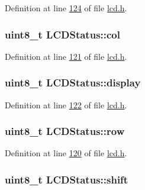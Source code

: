 Definition at line \hyperlink{lcd_8h_source_l00124}{124} of file \hyperlink{lcd_8h_source}{lcd.\-h}.

\hypertarget{struct_l_c_d_status_a79a5d5cb370566c8638d9a3866ff8e6b}{
\subsubsection[{col}]{\setlength{\rightskip}{0pt plus 5cm}uint8\-\_\-t L\-C\-D\-Status\-::col}}\label{struct_l_c_d_status_a79a5d5cb370566c8638d9a3866ff8e6b}


Definition at line \hyperlink{lcd_8h_source_l00121}{121} of file \hyperlink{lcd_8h_source}{lcd.\-h}.

\hypertarget{struct_l_c_d_status_a844c7ce7851d43e9459d28c2e93d715a}{
\subsubsection[{display}]{\setlength{\rightskip}{0pt plus 5cm}uint8\-\_\-t L\-C\-D\-Status\-::display}}\label{struct_l_c_d_status_a844c7ce7851d43e9459d28c2e93d715a}


Definition at line \hyperlink{lcd_8h_source_l00122}{122} of file \hyperlink{lcd_8h_source}{lcd.\-h}.

\hypertarget{struct_l_c_d_status_a1032713b3106af056748cc1766bbf67f}{
\subsubsection[{row}]{\setlength{\rightskip}{0pt plus 5cm}uint8\-\_\-t L\-C\-D\-Status\-::row}}\label{struct_l_c_d_status_a1032713b3106af056748cc1766bbf67f}


Definition at line \hyperlink{lcd_8h_source_l00120}{120} of file \hyperlink{lcd_8h_source}{lcd.\-h}.

\hypertarget{struct_l_c_d_status_ad69f767818d8a15e1fd6935e07df3770}{
\subsubsection[{shift}]{\setlength{\rightskip}{0pt plus 5cm}uint8\-\_\-t L\-C\-D\-Status\-::shift}}\label{struct_l_c_d_status_ad69f767818d8a15e1fd6935e07df3770}


